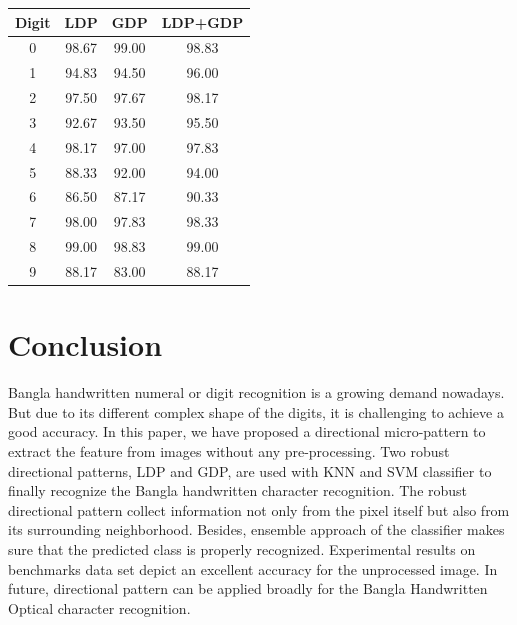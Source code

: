 \documentclass[conference]{IEEEtran}
\begin{document}
\begin{center}
	\label{table_LDP+GDP}
	\begin{tabular}{cccc}
		\hline
		Digit & LDP & GDP & LDP+GDP \\
		\hline
		0 & 98.67 & 99.00 & 98.83\\
		1 & 94.83 & 94.50 & 96.00\\
		2 & 97.50 & 97.67 & 98.17\\
		3 & 92.67 & 93.50 & 95.50\\
		4 & 98.17 & 97.00 & 97.83\\
		5 & 88.33 & 92.00 & 94.00\\
		6 & 86.50 & 87.17 & 90.33\\
		7 & 98.00 & 97.83 & 98.33\\
		8 & 99.00 & 98.83 & 99.00\\
		9 & 88.17 & 83.00 & 88.17\\
		\hline
	\end{tabular}
\end{center}

\section{Conclusion}
Bangla handwritten numeral or digit recognition is a growing demand nowadays. But due to its different complex shape of the digits, it is challenging to achieve a good accuracy. In this paper, we have proposed a directional micro-pattern to extract the feature from images without any pre-processing. Two robust directional patterns, LDP and GDP, are used with KNN and SVM classifier to finally recognize the Bangla handwritten character recognition. The robust directional pattern collect information not only from the pixel itself but also from its surrounding neighborhood. Besides, ensemble approach of the classifier makes sure that the predicted class is properly recognized. Experimental results on benchmarks data set depict an excellent accuracy for the unprocessed image. In future, directional pattern can be applied broadly for the Bangla Handwritten Optical character recognition.




\end{document}

